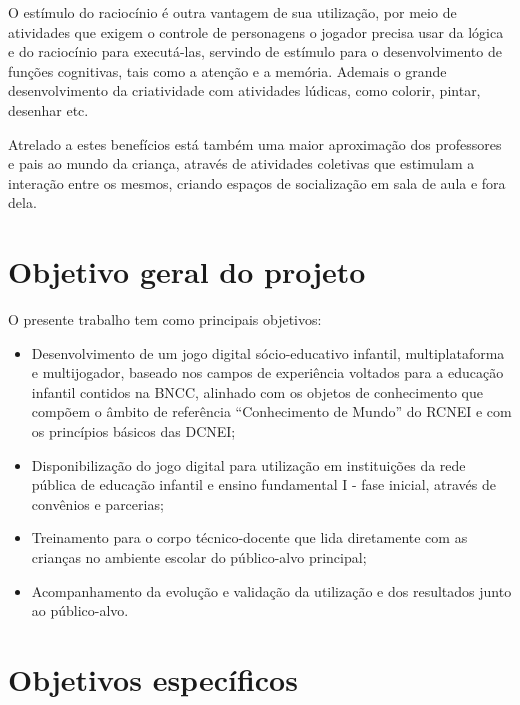 \documentclass[article,12pt,openany,oneside,a4paper,english,brazil]{abntex2}
\begin{document}
O estímulo do raciocínio é outra vantagem de sua utilização, por meio de atividades que exigem o controle de personagens o jogador precisa usar da lógica e do raciocínio para executá-las, servindo de estímulo para o desenvolvimento de funções cognitivas, tais como a atenção e a memória. Ademais o grande desenvolvimento da criatividade com atividades lúdicas, como colorir, pintar, desenhar etc.

Atrelado a estes benefícios está também uma maior aproximação dos professores e pais ao mundo da criança, através de atividades coletivas que estimulam a interação entre os mesmos, criando espaços de socialização em sala de aula e fora dela.

\section{Objetivo geral do projeto}
\label{sc:objetivo}

O  presente  trabalho  tem  como principais objetivos:
\begin{itemize}
    \item Desenvolvimento de um jogo digital sócio-educativo infantil, multiplataforma e multijogador, baseado nos campos de experiência voltados para a educação infantil contidos na BNCC, alinhado com os objetos de conhecimento que compõem o âmbito de referência “Conhecimento de Mundo” do RCNEI e com os princípios básicos das DCNEI;

    \item Disponibilização do jogo digital para utilização em instituições da rede pública de educação infantil e ensino fundamental I - fase inicial, através de convênios e parcerias;
    
    \item Treinamento para o corpo técnico-docente que lida diretamente com as crianças no ambiente escolar do público-alvo principal;
    
    \item Acompanhamento da evolução e validação da utilização e dos resultados junto ao público-alvo.
\end{itemize}

\section{Objetivos específicos}
\label{sc:obj_esp}
\end{document}
